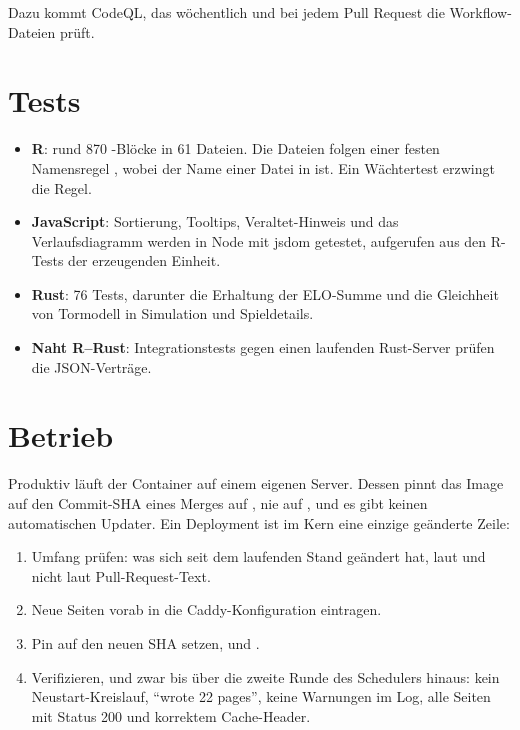 Dazu kommt CodeQL, das wöchentlich und bei jedem Pull Request die
Workflow-Dateien prüft.

\section{Tests}

\begin{itemize}
  \item \textbf{R}: rund 870 -Blöcke in 61 Dateien. Die
        Dateien folgen einer festen Namensregel
        , wobei  der Name
        einer Datei in  ist. Ein Wächtertest erzwingt die Regel.
  \item \textbf{JavaScript}: Sortierung, Tooltips, Veraltet-Hinweis und das
        Verlaufsdiagramm werden in Node mit jsdom getestet, aufgerufen aus den
        R-Tests der erzeugenden Einheit.
  \item \textbf{Rust}: 76 Tests, darunter die Erhaltung der ELO-Summe und
        die Gleichheit von Tormodell in Simulation und Spieldetails.
  \item \textbf{Naht R–Rust}: Integrationstests gegen einen laufenden
        Rust-Server prüfen die JSON-Verträge.
\end{itemize}

\section{Betrieb}

Produktiv läuft der Container auf einem eigenen Server. Dessen
 pinnt das Image auf den Commit-SHA eines Merges auf
, nie auf , und es gibt keinen automatischen
Updater. Ein Deployment ist im Kern eine einzige geänderte Zeile:

\begin{enumerate}
  \item Umfang prüfen: was sich seit dem laufenden Stand geändert hat, laut
         und nicht laut Pull-Request-Text.
  \item Neue Seiten vorab in die Caddy-Konfiguration eintragen.
  \item Pin auf den neuen SHA setzen,  und
        .
  \item Verifizieren, und zwar bis über die zweite Runde des Schedulers
        hinaus: kein Neustart-Kreislauf, \enquote{wrote 22 pages}, keine
        Warnungen im Log, alle Seiten mit Status 200 und korrektem
        Cache-Header.
\end{enumerate}

